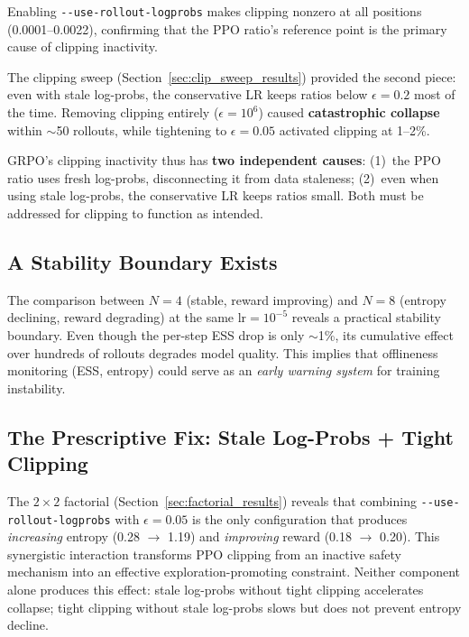 \documentclass[11pt,a4paper]{article}
\begin{document}
Enabling \texttt{-{}-use-rollout-logprobs} makes clipping nonzero at all
positions (0.0001--0.0022), confirming that the PPO ratio's reference point
is the primary cause of clipping inactivity.

The clipping sweep (Section~\ref{sec:clip_sweep_results}) provided the second
piece: even with stale log-probs, the conservative LR keeps ratios below
$\epsilon = 0.2$ most of the time. Removing clipping entirely ($\epsilon = 10^6$)
caused \textbf{catastrophic collapse} within $\sim$50 rollouts, while
tightening to $\epsilon = 0.05$ activated clipping at 1--2\%.

GRPO's clipping inactivity thus has \textbf{two independent causes}:
(1)~the PPO ratio uses fresh log-probs, disconnecting it from data staleness;
(2)~even when using stale log-probs, the conservative LR keeps ratios small.
Both must be addressed for clipping to function as intended.

\subsection{A Stability Boundary Exists}

The comparison between $N = 4$ (stable, reward improving) and $N = 8$ (entropy
declining, reward degrading) at the same $\mathrm{lr} = 10^{-5}$ reveals a
practical stability boundary. Even though the per-step ESS drop is only
$\sim$1\%, its cumulative effect over hundreds of rollouts degrades model
quality. This implies that offlineness monitoring (ESS, entropy) could serve as
an \emph{early warning system} for training instability.

\subsection{The Prescriptive Fix: Stale Log-Probs + Tight Clipping}

The $2 \times 2$ factorial (Section~\ref{sec:factorial_results}) reveals
that combining \texttt{-{}-use-rollout-logprobs} with $\epsilon = 0.05$
is the only configuration that produces \emph{increasing} entropy
(0.28 $\to$ 1.19) and \emph{improving} reward (0.18 $\to$ 0.20). This
synergistic interaction transforms PPO clipping from an inactive safety
mechanism into an effective exploration-promoting constraint. Neither
component alone produces this effect: stale log-probs without tight
clipping accelerates collapse; tight clipping without stale log-probs
slows but does not prevent entropy decline.
\end{document}
